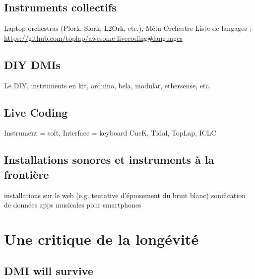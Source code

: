 \subsection{Instruments collectifs}
Laptop orchestras (Plork, Slork, L2Ork, etc.), Méta-Orchestre
Liste de langages : \url{https://github.com/toplap/awesome-livecoding#languages}

\subsection{DIY DMIs}
Le \gls{DIY}, instruments en kit, arduino, bela, modular, ethersense, etc.

\subsection{Live Coding}
Instrument = soft, Interface = keyboard
CucK, Tidal, TopLap, \gls{ICLC}

\subsection{Installations sonores et instruments à la frontière}
installations sur le web (e.g. tentative d'épuisement du bruit blanc)
sonification de données
apps musicales pour smartphones

\section{Une critique de la longévité}
\label{sec:ephemerality:critique}

\subsection{DMI will survive}

